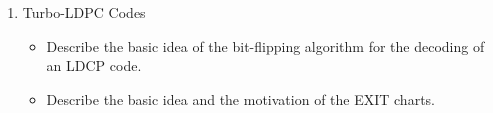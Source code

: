 \documentclass[11pt]{article}
\begin{document}
\begin{enumerate}
\item Turbo-LDPC Codes
\begin{itemize}
\item Describe the basic idea of the bit-flipping algorithm for the decoding of an LDCP code.
\item Describe the basic idea and the motivation of the EXIT charts.
\end{itemize}


\end{enumerate}



\end{document}
